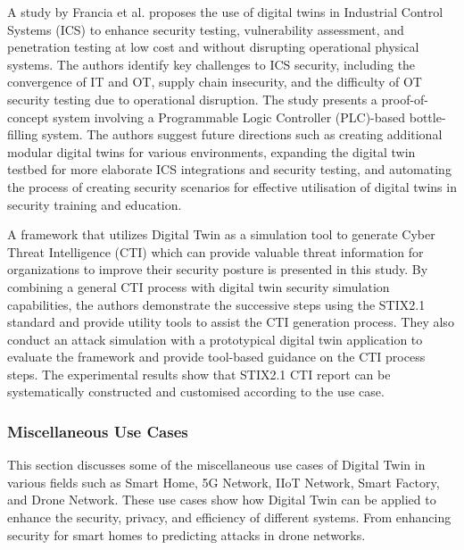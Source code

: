 A study by Francia et al.\cite{franciaDigitalTwinsIndustrial2021} proposes the use of digital twins in Industrial Control Systems (ICS) to enhance security testing, vulnerability assessment, and penetration testing at low cost and without disrupting operational physical systems. The authors identify key challenges to ICS security, including the convergence of IT and OT, supply chain insecurity, and the difficulty of OT security testing due to operational disruption. The study presents a proof-of-concept system involving a Programmable Logic Controller (PLC)-based bottle-filling system. The authors suggest future directions such as creating additional modular digital twins for various environments, expanding the digital twin testbed for more elaborate ICS integrations and security testing, and automating the process of creating security scenarios for effective utilisation of digital twins in security training and education.

A framework that utilizes Digital Twin as a simulation tool to generate Cyber Threat Intelligence (CTI) which can provide valuable threat information for organizations to improve their security posture is presented in this study\cite{dietzHarnessingDigitalTwin2022}. By combining a general CTI process with digital twin security simulation capabilities, the authors demonstrate the successive steps using the STIX2.1 standard and provide utility tools to assist the CTI generation process. They also conduct an attack simulation with a prototypical digital twin application to evaluate the framework and provide tool-based guidance on the CTI process steps. The experimental results show that STIX2.1 CTI report can be systematically constructed and customised according to the use case. 



\subsubsection{Miscellaneous Use Cases } 
This section discusses some of the miscellaneous use cases of Digital Twin in various fields such as Smart Home, 5G Network, IIoT Network, Smart Factory, and Drone Network. These use cases show how Digital Twin can be applied to enhance the security, privacy, and efficiency of different systems. From enhancing security for smart homes to predicting attacks in drone networks.
  

